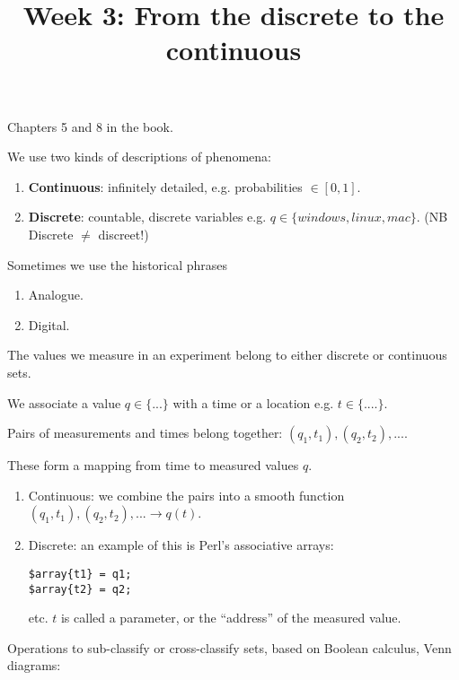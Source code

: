 \documentclass{slides}
\title{Week 3: From the discrete to the continuous}
\begin{document}
\maketitle

Chapters 5 and 8 in the book.

We use two kinds of descriptions of phenomena:

\begin{enumerate}
\item {\bf Continuous}: infinitely detailed, e.g. probabilities $\in [0,1]$.
\item {\bf Discrete}: countable, discrete variables e.g. $q \in\{windows,linux,mac\}$. (NB Discrete $\not =$ discreet!)
\end{enumerate}

Sometimes we use the historical phrases

\begin{enumerate}
\item Analogue.
\item Digital.
\end{enumerate}

The values we measure in an experiment belong to either discrete or continuous sets.


We associate a value $q \in \{ ... \}$ with a time or a location e.g. $t \in \{....\}$.

Pairs of measurements and times belong together: $(q_1,t_1), (q_2,t_2), ...$.

These form a mapping from time to measured values $q$.



\begin{enumerate}
\item Continuous: we combine the pairs into a smooth function $(q_1,t_1), (q_2,t_2), ... \rightarrow  q(t)$.

\item Discrete: an example of this is Perl's associative arrays:
\begin{verbatim}
$array{t1} = q1;
$array{t2} = q2;
\end{verbatim}
etc.
$t$ is called a parameter, or the ``address'' of the measured value.
\end{enumerate}


Operations to sub-classify or cross-classify sets, based on Boolean calculus, Venn diagrams:
\end{document}
